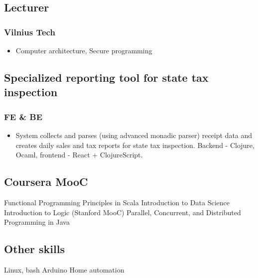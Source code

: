 \documentclass[11pt]{article}
\begin{document}
\subsection{Lecturer}
\subsubsection{Vilnius Tech}
\begin{itemize}
\item Computer architecture, Secure programming
\end{itemize}

\subsection{Specialized reporting tool for state tax inspection}
\subsubsection{FE \& BE }
\begin{itemize}
\item System collects and parses (using advanced monadic parser) receipt data and creates daily sales and tax reports for state tax inspection. Backend - Clojure, Ocaml, frontend - React + ClojureScript.
\end{itemize}

\subsection{Coursera MooC}
\textbullet{}Functional Programming Principles in Scala
\textbullet{}Introduction to Data Science
\textbullet{}Introduction to Logic (Stanford MooC)
\textbullet{}Parallel, Concurrent, and Distributed Programming in Java

\subsection{Other skills}
\textbullet{}Linux, bash
\textbullet{}Arduino
\textbullet{}Home automation
\end{document}
